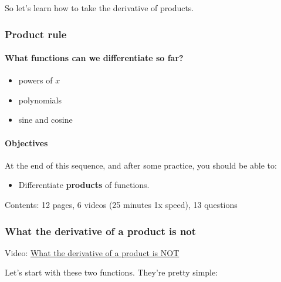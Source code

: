 \documentclass[pdftex, brazil, 12pt, twoside]{article}
\begin{document}
So let's learn how to take the derivative of products.

\subsubsection{Product rule}
\label{u2-product-rule-obj}

\paragraph{What functions can we differentiate so far?}
\begin{itemize}[noitemsep]
\item powers of $x$
\item polynomials
\item sine and cosine
\end{itemize}

\paragraph{Objectives} At the end of this sequence, and after some practice, you
should be able to:
\begin{itemize}[noitemsep]
\item Differentiate \textbf{products} of functions.
\end{itemize}

Contents: 12 pages, 6 videos (25 minutes 1x speed), 13 questions

\subsubsection{What the derivative of a product is not}
\label{u2-product-rule-what-product-is-not}

Video: \href{https://www.youtube.com/watch?v=XrYdgV5YxfA}{What the derivative of a product is NOT}

Let's start with these two functions.
They're pretty simple:

\begin{figure}[H]
  \begin{center}
  \end{center}
\end{figure}
\end{document}

